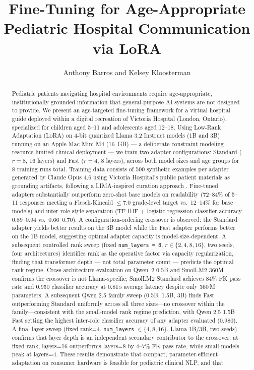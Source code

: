 \documentclass[journal]{IEEEtai}
\begin{document}
\title{Fine-Tuning for Age-Appropriate Pediatric Hospital Communication via LoRA}


\author{Anthony Barros and Kelsey Kloosterman}

\maketitle

\begin{abstract}
Pediatric patients navigating hospital environments require age-appropriate, institutionally grounded information that general-purpose AI systems are not designed to provide. We present an age-targeted fine-tuning framework for a virtual hospital guide deployed within a digital recreation of Victoria Hospital (London, Ontario), specialized for children aged 5--11 and adolescents aged 12--18. Using Low-Rank Adaptation (LoRA) on 4-bit quantized Llama 3.2 Instruct models (1B and 3B) running on an Apple Mac Mini M4 (16~GB) --- a deliberate constraint modeling resource-limited clinical deployment --- we train two adapter configurations: Standard ($r=8$, 16 layers) and Fast ($r=4$, 8 layers), across both model sizes and age groups for 8 training runs total. Training data consists of 500 synthetic examples per adapter generated by Claude Opus 4.6 using Victoria Hospital's public patient materials as grounding artifacts, following a LIMA-inspired curation approach \cite{zhou2023lima}. Fine-tuned adapters substantially outperform zero-shot base models on readability (72--84\% of 5--11 responses meeting a Flesch-Kincaid $\leq 7.0$ grade-level target vs.\ 12--14\% for base models) and inter-role style separation (TF-IDF + logistic regression classifier accuracy 0.89--0.94 vs.\ 0.66--0.70). A configuration-ordering crossover is observed: the Standard adapter yields better results on the 3B model while the Fast adapter performs better on the 1B model, suggesting optimal adapter capacity is model-size-dependent. A subsequent controlled rank sweep (fixed \texttt{num\_layers~=~8}, $r \in \{2, 4, 8, 16\}$, two seeds, four architectures) identifies rank as the operative factor via capacity regularization, finding that transformer depth --- not total parameter count --- predicts the optimal rank regime. Cross-architecture evaluation on Qwen~2 0.5B and SmolLM2 360M confirms the crossover is not Llama-specific; SmolLM2 Standard achieves 84\% FK pass rate and 0.950 classifier accuracy at 0.81\,s average latency despite only 360\,M parameters. A subsequent Qwen 2.5 family sweep (0.5B, 1.5B, 3B) finds Fast outperforming Standard uniformly across all three sizes---no crossover within the family---consistent with the small-model rank regime prediction, with Qwen 2.5 1.5B Fast setting the highest inter-role classifier accuracy of any adapter evaluated (0.980). A final layer sweep (fixed rank=4, \texttt{num\_layers} $\in \{4, 8, 16\}$, Llama 1B/3B, two seeds) confirms that layer depth is an independent secondary contributor to the crossover: at fixed rank, layers=16 outperforms layers=8 by 4--7\% FK pass rate, while small models peak at layers=4. These results demonstrate that compact, parameter-efficient adaptation on consumer hardware is feasible for pediatric clinical NLP, and that 
\end{abstract}
\end{document}
